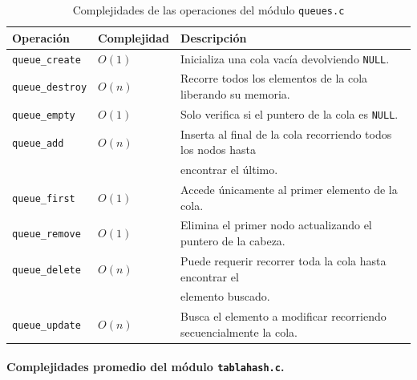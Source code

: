\documentclass[12pt,a4paper]{article}
\begin{document}
\begin{table}[h!]
\centering
\begin{tabular}{@{}lll@{}}
\toprule
\textbf{Operación} & \textbf{Complejidad} & \textbf{Descripción} \\
\midrule
\texttt{queue\_create}  & $O(1)$ & Inicializa una cola vacía devolviendo \texttt{NULL}. \\
\texttt{queue\_destroy} & $O(n)$ & Recorre todos los elementos de la cola liberando su memoria. \\
\texttt{queue\_empty}   & $O(1)$ & Solo verifica si el puntero de la cola es \texttt{NULL}. \\
\texttt{queue\_add}     & $O(n)$ & Inserta al final de la cola recorriendo todos los nodos hasta	\\&& encontrar el último. \\
\texttt{queue\_first}   & $O(1)$ & Accede únicamente al primer elemento de la cola. \\
\texttt{queue\_remove}  & $O(1)$ & Elimina el primer nodo actualizando el puntero de la cabeza. \\
\texttt{queue\_delete}  & $O(n)$ & Puede requerir recorrer toda la cola hasta encontrar el	\\&& elemento buscado. \\
\texttt{queue\_update}  & $O(n)$ & Busca el elemento a modificar recorriendo secuencialmente la cola. \\
\bottomrule
\end{tabular}
\caption{Complejidades de las operaciones del módulo \texttt{queues.c}}
\end{table}
 
\paragraph{Complejidades promedio del módulo \texttt{tablahash.c}.}
 
\end{document}
